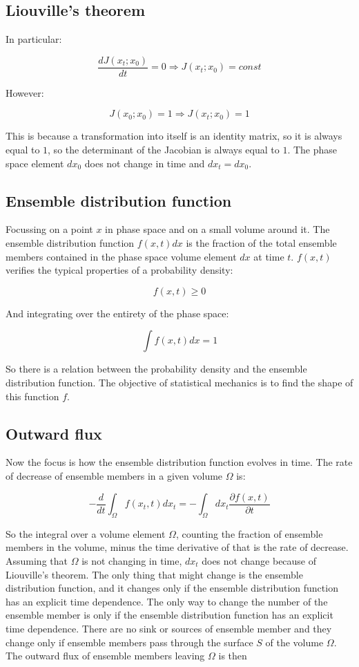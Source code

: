 	\subsection{Liouville's  theorem}
	In particular:

	$$\frac{dJ(x_t;x_0)}{dt} = 0\Rightarrow J(x_t;x_0) = const$$

	However:

	$$J(x_0;x_0) = 1\Rightarrow J(x_t;x_0) = 1$$

	This is because a transformation into itself is an identity matrix, so it is always equal to $1$, so the determinant of the Jacobian is always equal to $1$.
	The phase space element $dx_0$ does not change in time and $dx_t = dx_0$.

	\subsection{Ensemble distribution function}
	Focussing  on a point $x$ in phase space and on a small volume around it.
	The ensemble distribution function $f(x,t)dx$ is the fraction of the total ensemble members contained in the phase space volume element $dx$ at time $t$.
	$f(x,t)$ verifies the typical properties of a probability density:

	$$f(x,t) \ge 0$$

	And integrating over the entirety of the phase space:

	$$\int f(x,t)dx = 1$$

	So there is a relation between the probability density and the ensemble distribution function.
	The objective of statistical mechanics is to find the shape of this function $f$.

	\subsection{Outward flux}
	Now the focus is how the ensemble distribution function evolves in time.
	The rate of decrease of ensemble members in a given volume $\Omega$ is:

	$$-\frac{d}{dt}\int_\Omega f(x_t, t)dx_t = -\int_\Omega dx_t\frac{\partial f(x,t)}{\partial t}$$

	So the integral over a volume element $\Omega$, counting the fraction of ensemble members in the volume, minus the time derivative of that is the rate of decrease.
	Assuming that $\Omega$ is not changing in time, $dx_t$ does not change because of Liouville's theorem.
	The only thing that might change is the ensemble distribution function, and it changes only if the ensemble distribution function has an explicit time dependence.
	The only way to change the number of the ensemble member is only if the ensemble distribution function has an explicit time dependence.
	There are no sink or sources of ensemble member and they change only if ensemble members pass through the surface $S$ of the volume $\Omega$.
	The outward flux of ensemble members leaving $\Omega$ is then

